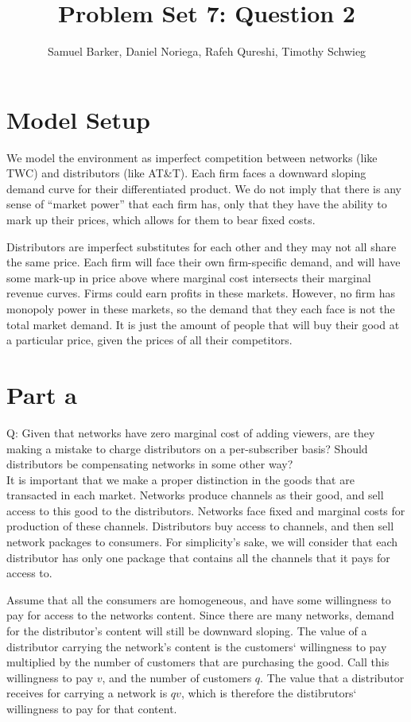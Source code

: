 \documentclass[12pt]{paper}
\title{Problem Set 7: Question 2}
\author{Samuel Barker, Daniel Noriega, Rafeh Qureshi, Timothy Schwieg}
\begin{document}
\maketitle


\section*{Model Setup}

We model the environment as imperfect competition between networks (like TWC) and
distributors (like AT\&T). Each firm faces a downward sloping
demand curve for their differentiated product. We do not imply that
there is any sense of ``market power'' that each firm has, only that
they have the ability to mark up their prices, which allows for them
to bear fixed costs.


Distributors are imperfect substitutes for each other and they may not
all share the same price. Each firm will face their own firm-specific
demand, and will have some mark-up in price above where marginal cost
intersects their marginal revenue curves. Firms could earn profits in
these markets. However, no firm has monopoly power in these markets,
so the demand that they each face is not the total market demand. It
is just the amount of people that will buy their good at a particular
price, given the prices of all their competitors.


\section*{Part a}

Q: Given that networks have zero marginal cost of
adding viewers, are they making a mistake to charge
distributors on a per-subscriber basis? Should
distributors be compensating networks in some other way?
\\

It is important that we make a proper distinction in the goods that
are transacted in each market. Networks produce channels as
their good, and sell access to this good to the distributors. Networks face fixed and marginal costs for
production of these channels. Distributors buy access to channels, and then sell network packages to
consumers. For simplicity's sake, we will consider that each
distributor has only one package that contains all the channels that
it pays for access to.


Assume that all the consumers are homogeneous, and have some
willingness to pay for access to the networks content. Since there are
many networks, demand for the distributor's content will still be
downward sloping. The value of a distributor carrying the network's
content is the customers` willingness to pay multiplied by the number
of customers that are purchasing the good. Call this willingness to
pay $v$, and the number of customers $q$. The value that a distributor
receives for carrying a network is $qv$, which is therefore the
distibrutors` willingness to pay for that content.
\end{document}
